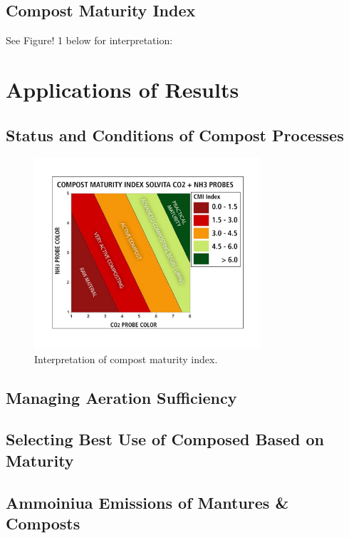 \documentclass[12pt]{../SOP4_alpha}\usepackage[]{graphicx}\usepackage[]{xcolor}
\begin{document}
\subsection{Compost Maturity Index}

\NP See Figure! 1 below for interpretation:

\section{Applications of Results}

\subsection{Status and Conditions of Compost Processes}

\begin{figure}[ht]
\centering
\includegraphics[width=0.75\textwidth]{graphics/Solvita_CMI_Calculator}
\caption{Interpretation of compost maturity index.}
\label{fig:fig1}
\end{figure}

\subsection{Managing Aeration Sufficiency}

\subsection{Selecting Best Use of Composed Based on Maturity}


\subsection{Ammoiniua Emissions of Mantures \& Composts}
\end{document}
